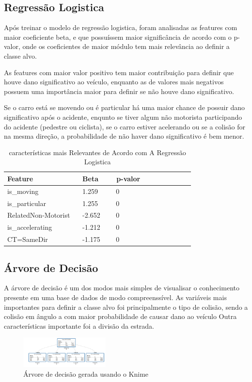 \documentclass[conference]{IEEEtran}
\begin{document}
\subsection{Regressão Logistica}
Após treinar o modelo de regressão logistica, foram analisadas as features com maior coeficiente beta, e que possuíssem maior 
significância de acordo com o p-valor, onde os coeficientes de maior módulo tem mais relevância ao definir a classe alvo.

As features com maior valor positivo tem maior contribuição para definir que houve
dano significativo ao veículo, enquanto as de valores mais negativos possuem uma importância maior para definir se não houve dano significativo.

Se o carro está se movendo ou é particular há uma maior chance de possuir dano significativo após o acidente, enqunto se tiver algum não motorista
participando do acidente (pedestre ou ciclista), se o carro estiver acelerando ou se a colisão for na mesma direção, a probabilidade de 
não haver dano significativo é bem menor.

\begin{table}[!ht]
    \centering
    \caption{características mais Relevantes de Acordo com A Regressão Logistica}
    \begin{tabular}{|l|l|l|l|l|l|l|l|l|l|}
    \hline
        Feature~ & Beta~ & ~p-valor  \\ \hline
        is\_moving~ &  1.259~ & ~0  \\ \hline
        is\_particular~ & 1.255~ & ~0  \\ \hline
        RelatedNon-Motorist ~ & -2.652~ & ~0  \\ \hline
        is\_accelerating ~ & -1.212 ~ & ~0  \\ \hline
        CT=SameDir ~ & -1.175 ~ & ~0  \\ \hline
    \end{tabular}
\end{table}





\subsection{Árvore de Decisão}

A árvore de decisão é um dos modos mais simples de visualisar o conhecimento presente em uma 
base de dados de modo compreenssível. As variáveis mais importantes para definir a classe alvo foi principalmente o tipo de colisão,
sendo a colisão em ângulo a com maior probabilidade de causar dano ao veículo Outra características importante foi a divisão da estrada.
\begin{figure}[H]
\centerline{\includegraphics[width=0.4\textwidth]{Images/decision-tree.png}}
\caption{\label{fig:decision-tree} Árvore de decisão gerada usando o Knime}
\end{figure}
\end{document}
